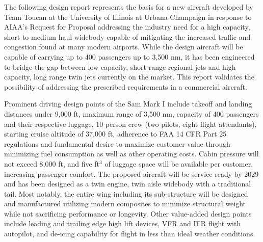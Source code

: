 The following design report represents the basis for a new aircraft developed by Team Toucan at the University of Illinois at Urbana-Champaign in response to AIAA's Request for Proposal\cite{RFP} addressing the industry need for a high capacity, short to medium haul widebody capable of mitigating the increased traffic and congestion found at many modern airports.  While the design aircraft will be capable of carrying up to 400 passengers up to 3,500 nm, it has been engineered to bridge the gap between low capacity, short range regional jets and high capacity, long range twin jets currently on the market.  This report validates the possibility of addressing the prescribed requirements in a commercial aircraft.

Prominent driving design points of the Sam Mark I include takeoff and landing distances under 9,000 ft, maximum range of 3,500 nm, capacity of 400 passengers and their respective luggage, 10 person crew (two pilots, eight flight attendants), starting cruise altitude of 37,000 ft, adherence to FAA 14 CFR Part 25 regulations and fundamental desire to maximize customer value through minimizing fuel consumption as well as other operating costs.  Cabin pressure will not exceed 8,000 ft, and five ft$^3$ of luggage space will be available per customer, increasing passenger comfort.  The proposed aircraft will be service ready by 2029 and has been designed as a twin engine, twin aisle widebody with a traditional tail.  Most notably, the entire wing including its sub-structure will be designed and manufactured utilizing modern composites to minimize structural weight while not sacrificing performance or longevity.  Other value-added design points include leading and trailing edge high lift devices, VFR and IFR flight with autopilot, and de-icing capability for flight in less than ideal weather conditions.

